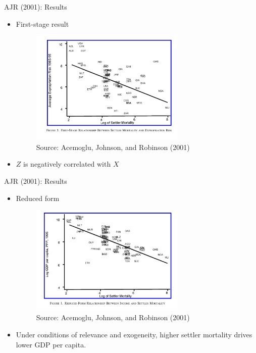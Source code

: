 \documentclass[11pt,notes=hide,aspectratio=169,mathserif]{beamer}
\begin{document}
\begin{frame}{AJR (2001): Results}
\begin{itemize}
\item First-stage result
\begin{figure}
\centering
\includegraphics[width=0.7\textwidth]{inputs/AJR2.png}
\caption{Source: Acemoglu, Johnson, and Robinson (2001)}
\end{figure}
\item $Z$ is negatively correlated with $X$
\end{itemize}
\end{frame}

\begin{frame}{AJR (2001): Results}
\begin{itemize}
\item Reduced form
\begin{figure}
\centering
\includegraphics[width=0.7\textwidth]{inputs/AJR3.png}
\caption{Source: Acemoglu, Johnson, and Robinson (2001)}
\end{figure}
\item Under conditions of relevance and exogeneity, higher settler mortality drives lower GDP per capita. 
\end{itemize}
\end{frame}
\end{document}
